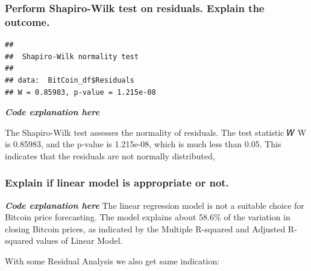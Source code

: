 \documentclass[
]{book}
\newenvironment{Shaded}{\begin{snugshade}}{\end{snugshade}}
\newcommand{\CommentTok}[1]{\textcolor[rgb]{0.56,0.35,0.01}{\textit{#1}}}
\newcommand{\FunctionTok}[1]{\textcolor[rgb]{0.13,0.29,0.53}{\textbf{#1}}}
\newcommand{\NormalTok}[1]{#1}
\newcommand{\OtherTok}[1]{\textcolor[rgb]{0.56,0.35,0.01}{#1}}
\newcommand{\SpecialCharTok}[1]{\textcolor[rgb]{0.81,0.36,0.00}{\textbf{#1}}}
\begin{document}
\subsubsection{Perform Shapiro-Wilk test on residuals. Explain the outcome.}\label{perform-shapiro-wilk-test-on-residuals.-explain-the-outcome.}

\begin{Shaded}
\end{Shaded}

\begin{verbatim}
## 
##  Shapiro-Wilk normality test
## 
## data:  BitCoin_df$Residuals
## W = 0.85983, p-value = 1.215e-08
\end{verbatim}

\emph{\textbf{Code explanation here}}

The Shapiro-Wilk test assesses the normality of residuals. The test statistic
𝑊
W is 0.85983, and the p-value is 1.215e-08, which is much less than 0.05. This indicates that the residuals are not normally distributed,

\subsubsection{Explain if linear model is appropriate or not.}\label{explain-if-linear-model-is-appropriate-or-not.}

\emph{\textbf{Code explanation here}}
The linear regression model is not a suitable choice for Bitcoin price forecasting. The model explains about 58.6\% of the variation in closing Bitcoin prices, as indicated by the Multiple R-squared and Adjusted R-squared values of Linear Model.

With some Residual Analysis we also get same indication:
\end{document}
